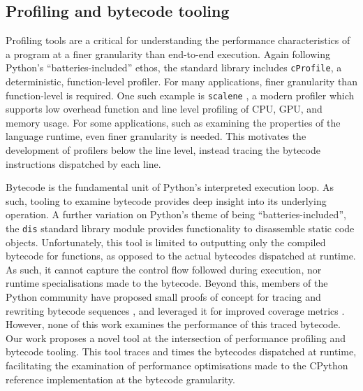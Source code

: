 \subsection{Profiling and bytecode tooling}
\label{ssec:profiling-bytecode-tooling}

Profiling tools are a critical for understanding the performance characteristics of a program at a finer granularity than end-to-end execution.
Again following Python's ``batteries-included'' ethos, the standard library includes \texttt{cProfile}, a deterministic, function-level profiler.
For many applications, finer granularity than function-level is required.
One such example is \texttt{scalene} \cite{bergerTriangulatingPythonPerformance2023a}, a modern profiler which supports low overhead function and line level profiling of CPU, GPU, and memory usage.
For some applications, such as examining the properties of the language runtime, even finer granularity is needed. This motivates the development of profilers below the line level, instead tracing the bytecode instructions dispatched by each line.

Bytecode is the fundamental unit of Python's interpreted execution loop. As such, tooling to examine bytecode provides deep insight into its underlying operation.
A further variation on Python's theme of being ``batteries-included'', the \texttt{dis} standard library module provides functionality to disassemble static code objects. Unfortunately, this tool is limited to outputting only the compiled bytecode for functions, as opposed to the actual bytecodes dispatched at runtime. As such, it cannot capture the control flow followed during execution, nor runtime specialisations made to the bytecode.
Beyond this, members of the Python community have proposed small proofs of concept for tracing and rewriting bytecode sequences \cite{0xecCodingReversingHacking2017} \cite{clementrouaultUnderstandingPythonExecution}, and leveraged it for improved coverage metrics \cite{nedbatchelderWickedHackPython2008}.
However, none of this work examines the performance of this traced bytecode.
Our work proposes a novel tool at the intersection of performance profiling and bytecode tooling.
This tool traces and times the bytecodes dispatched at runtime, facilitating the examination of performance optimisations made to the CPython reference implementation at the bytecode granularity.
